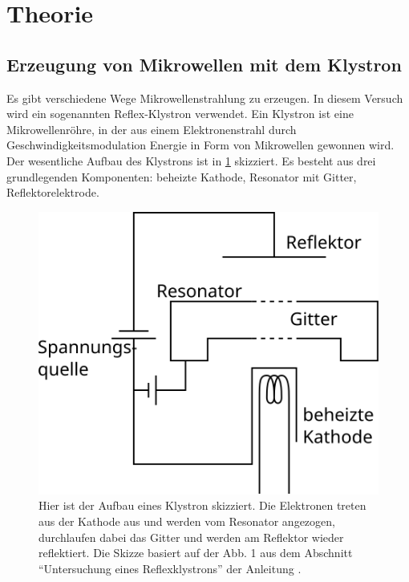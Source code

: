 
\section{Theorie}

\subsection{Erzeugung von Mikrowellen mit dem Klystron}

Es gibt verschiedene Wege Mikrowellenstrahlung zu erzeugen.  In diesem
Versuch wird ein sogenannten Reflex-Klystron verwendet.  Ein Klystron
ist eine Mikrowellenröhre, in der aus einem Elektronenstrahl durch
Geschwindigkeitsmodulation Energie in Form von Mikrowellen gewonnen
wird.  Der wesentliche Aufbau des Klystrons ist in \cref{fig:klystron}
skizziert.  Es besteht aus drei grundlegenden Komponenten: beheizte
Kathode, Resonator mit Gitter, Reflektorelektrode.

\begin{figure}
  \centering
  \includegraphics{abbildungen/klystron}
  \caption{Hier ist der Aufbau eines Klystron skizziert.  Die Elektronen
    treten aus der Kathode aus und werden vom Resonator angezogen,
    durchlaufen dabei das Gitter und werden am Reflektor wieder
    reflektiert.  Die Skizze basiert auf der Abb. 1 aus dem Abschnitt
    \enquote{Untersuchung eines Reflexklystrons} der Anleitung
    \cite{v053}.}
  \label{fig:klystron}
\end{figure}


